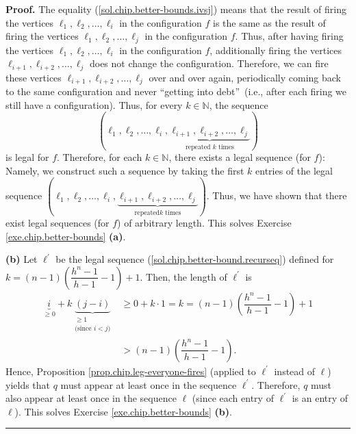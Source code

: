 \documentclass[numbers=enddot,12pt,final,onecolumn,notitlepage]{scrartcl}%
\theoremstyle{definition}
\newenvironment{proof}[1][Proof]{\noindent\textbf{#1.} }{\ \rule{0.5em}{0.5em}}
\begin{document}
\begin{proof}
The equality (\ref{sol.chip.better-bounds.ivsj}) means that the result of
firing the vertices $\ell_{1},\ell_{2},\ldots,\ell_{i}$ in the configuration
$f$ is the same as the result of firing the vertices $\ell_{1},\ell_{2}%
,\ldots,\ell_{j}$ in the configuration $f$. Thus, after having firing the
vertices $\ell_{1},\ell_{2},\ldots,\ell_{i}$ in the configuration $f$,
additionally firing the vertices $\ell_{i+1},\ell_{i+2},\ldots,\ell_{j}$ does
not change the configuration. Therefore, we can fire these vertices
$\ell_{i+1},\ell_{i+2},\ldots,\ell_{j}$ over and over again, periodically
coming back to the same configuration and never \textquotedblleft getting into
debt\textquotedblright\ (i.e., after each firing we still have a
configuration). Thus, for every $k\in\mathbb{N}$, the sequence%
\begin{equation}
\left(  \ell_{1},\ell_{2},\ldots,\ell_{i},\underbrace{\ell_{i+1},\ell
_{i+2},\ldots,\ell_{j}}_{\text{repeated }k\text{ times}}\right)
\label{sol.chip.better-bound.recurseq}%
\end{equation}
is legal for $f$. Therefore, for each $k\in\mathbb{N}$, there exists a legal
sequence (for $f$): Namely, we construct such a sequence by taking the first
$k$ entries of the legal sequence $\left(  \ell_{1},\ell_{2},\ldots,\ell
_{i},\underbrace{\ell_{i+1},\ell_{i+2},\ldots,\ell_{j}}_{\text{repeated
}k\text{ times}}\right)  $. Thus, we have shown that there exist legal
sequences (for $f$) of arbitrary length. This solves Exercise
\ref{exe.chip.better-bounds} \textbf{(a)}.

\textbf{(b)} Let $\ell^{\prime}$ be the legal sequence
(\ref{sol.chip.better-bound.recurseq}) defined for $k=\left(  n-1\right)
\left(  \dfrac{h^{n}-1}{h-1}-1\right)  +1$. Then, the length of $\ell^{\prime
}$ is%
\begin{align*}
\underbrace{i}_{\geq0}+k\underbrace{\left(  j-i\right)  }_{\substack{\geq
1\\\text{(since }i<j\text{)}}}  &  \geq0+k\cdot1=k=\left(  n-1\right)  \left(
\dfrac{h^{n}-1}{h-1}-1\right)  +1\\
&  >\left(  n-1\right)  \left(  \dfrac{h^{n}-1}{h-1}-1\right)  .
\end{align*}
Hence, Proposition \ref{prop.chip.leg-everyone-fires} (applied to
$\ell^{\prime}$ instead of $\ell$) yields that $q$ must appear at least once
in the sequence $\ell^{\prime}$. Therefore, $q$ must also appear at least once
in the sequence $\ell$ (since each entry of $\ell^{\prime}$ is an entry of
$\ell$). This solves Exercise \ref{exe.chip.better-bounds} \textbf{(b)}.
\end{proof}
\end{document}
